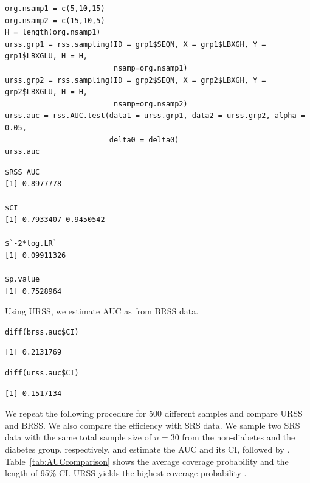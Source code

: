 \begin{verbatim}
org.nsamp1 = c(5,10,15)
org.nsamp2 = c(15,10,5)
H = length(org.nsamp1)
urss.grp1 = rss.sampling(ID = grp1$SEQN, X = grp1$LBXGH, Y = grp1$LBXGLU, H = H,
                         nsamp=org.nsamp1)
urss.grp2 = rss.sampling(ID = grp2$SEQN, X = grp2$LBXGH, Y = grp2$LBXGLU, H = H, 
                         nsamp=org.nsamp2)
urss.auc = rss.AUC.test(data1 = urss.grp1, data2 = urss.grp2, alpha = 0.05, 
                        delta0 = delta0)
urss.auc
\end{verbatim}
\begin{verbatim}
$RSS_AUC
[1] 0.8977778

$CI
[1] 0.7933407 0.9450542

$`-2*log.LR`
[1] 0.09911326

$p.value
[1] 0.7528964
\end{verbatim}

%
Using URSS, we estimate AUC as  from BRSS data. 
%

\begin{verbatim}
diff(brss.auc$CI)
\end{verbatim}
\begin{verbatim}
[1] 0.2131769
\end{verbatim}
\begin{verbatim}
diff(urss.auc$CI)
\end{verbatim}
\begin{verbatim}
[1] 0.1517134
\end{verbatim}

%
We repeat the following procedure for 500 different samples and compare URSS and BRSS. We also compare the efficiency with SRS data. We sample two SRS data with the same total sample size of $n=30$ from the non-diabetes and the diabetes group, respectively, and estimate the AUC and its CI, followed by \cite{Moon:2022}. Table~\ref{tab:AUCcomparison} shows the average coverage probability and the length of 95\% CI. URSS yields the highest coverage probability .
\begin{table}[!ht]
\centering
{}
\caption{Comparison of AUC inference results from RSS and SRS over 500 replicates.}\label{tab:AUCcomparison}
\end{table}
%

